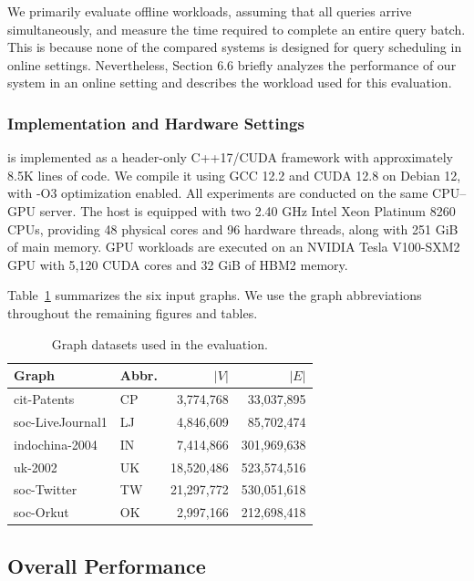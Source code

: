 We primarily evaluate offline workloads, assuming that all queries arrive simultaneously, and measure the time required to complete an entire query batch. This is because none of the compared systems is designed for query scheduling in online settings. Nevertheless, Section 6.6 briefly analyzes the performance of our system in an online setting and describes the workload used for this evaluation.


\subsubsection{Implementation and Hardware Settings}
\system is implemented as a header-only C++17/CUDA framework with approximately 8.5K lines of code. We compile it using GCC 12.2 and CUDA 12.8 on Debian 12, with -O3 optimization enabled. All experiments are conducted on the same CPU–GPU server. The host is equipped with two 2.40 GHz Intel Xeon Platinum 8260 CPUs, providing 48 physical cores and 96 hardware threads, along with 251 GiB of main memory. GPU workloads are executed on an NVIDIA Tesla V100-SXM2 GPU with 5,120 CUDA cores and 32 GiB of HBM2 memory.

Table~\ref{tab:datasets} summarizes the six input graphs. We use the graph
abbreviations throughout the remaining figures and tables.

\begin{table}[t]
  \centering
  \caption{Graph datasets used in the evaluation.}
  \label{tab:datasets}
  \small
  \begin{tabular}{llrr}
    \toprule
    Graph & Abbr. & $|V|$ & $|E|$ \\
    \midrule
    cit-Patents & CP & 3,774,768 & 33,037,895 \\
    soc-LiveJournal1 & LJ & 4,846,609 & 85,702,474 \\
    indochina-2004 & IN & 7,414,866 & 301,969,638 \\
    uk-2002 & UK & 18,520,486 & 523,574,516 \\
    soc-Twitter & TW & 21,297,772 & 530,051,618 \\
    soc-Orkut & OK & 2,997,166 & 212,698,418 \\
    \bottomrule
  \end{tabular}
\end{table}

\subsection{Overall Performance}


